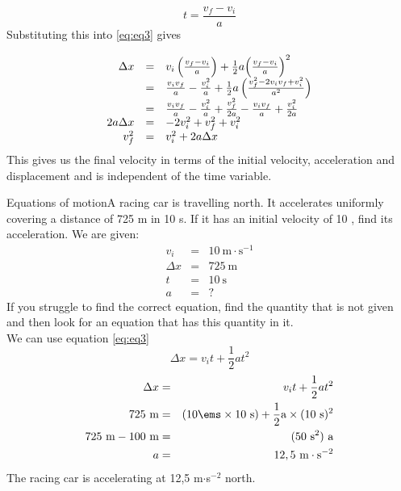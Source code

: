     \begin{equation*}
    t=\frac{{v}_{f}-{v}_{i}}{a}
      \end{equation*}
          \label{m38796*id77132}Substituting this into  \ref{eq:eq3} gives\par 
          \label{m38796*uid139}\nopagebreak\noindent{}
            
    \begin{equation*}
    \begin{array}{ccc}\hfill \Delta x& =& {v}_{i}\left(\frac{{v}_{f}-{v}_{i}}{a}\right)+\frac{1}{2}a{\left(\frac{{v}_{f}-{v}_{i}}{a}\right)}^{2}\hfill \\ & =& \frac{{v}_{i}{v}_{f}}{a}-\frac{v_{i}^{2}}{a}+\frac{1}{2}a\left(\frac{v_{f}^{2}-2{v}_{i}{v}_{f}+v_{i}^{2}}{{a}^{2}}\right)\hfill \\ & =& \frac{{v}_{i}{v}_{f}}{a}-\frac{v_{i}^{2}}{a}+\frac{v_{f}^{2}}{2a}-\frac{{v}_{i}{v}_{f}}{a}+\frac{v_{i}^{2}}{2a}\hfill \\ \hfill 2a\Delta x& =& -2v_{i}^{2}+v_{f}^{2}+v_{i}^{2}\hfill \\ \hfill v_{f}^{2}& =& v_{i}^{2}+2a\Delta x\hfill \end{array}
      \end{equation*}
          \label{m38796*id77586}This gives us the final velocity in terms of the initial velocity, acceleration and displacement and is independent of the time variable.\par 
\label{m38796*secfhsst!!!underscore!!!id4852}
      \noindent
\begin{wex}{Equations of motion}{A racing car is travelling north. It accelerates uniformly  covering a distance of 725 m in 10 s. If it has an initial velocity of 10 \ms, find its acceleration.}
{ We are given:
\begin{eqnarray*}
v_i&=&10\ \text{m} \cdot \text{s}^{-1}\\
\Delta x&=&725\ \text{m}\\
t&=&10\ \text{s}\\
a&=&?
\end{eqnarray*}
If you struggle to find the correct equation, find the quantity that is not given and then look for an equation that has this quantity in it.\\
We can use equation \ref{eq:eq3}
\begin{displaymath}
\Delta x=v_it +\frac{1}{2}at^2
\end{displaymath}
\begin{eqnarray*}
\Delta x &=& v_it +\frac{1}{2}at^2\\
725\text{~m} &=& (10\ems \times 10\text{~s}) + \frac{1}{2} \text{a} \times (10\text{~s})^2\\
725\text{~m} - 100\text{~m} &=& (50\text{~s}^2)~ \text{a}\\
a &=& 12,5~ \text{m} \cdot\text{s}^{-2}
\end{eqnarray*}
The racing car is accelerating at 12,5 m$\cdot$s$^{-2}$ north.}
\end{wex}

